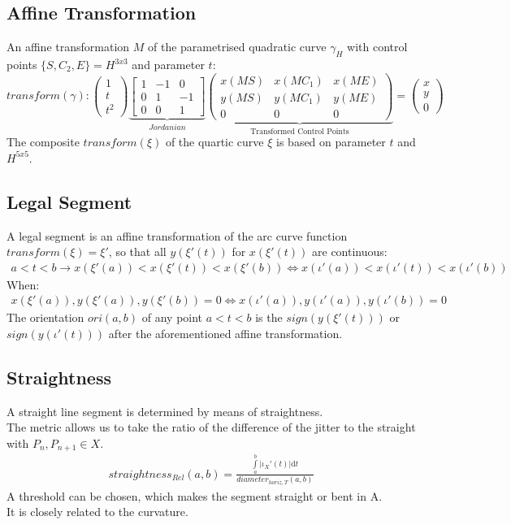 \documentclass{report}
\begin{document}
\subsection{Affine Transformation}
An affine transformation $M$ of the parametrised quadratic curve $\gamma_{H}$ with control points $\{S,C_{2},E\} = H^{3x3}$ and parameter $t$:
\begin{equation}
transform(\gamma):
\begin{pmatrix}
1 \\
t \\
t^2
\end{pmatrix}
\underbrace{\begin{bmatrix}
1 & -1 & 0\\
0 & 1 & -1\\
0 & 0 &1
\end{bmatrix}}_{Jordanian}
\underbrace{\begin{pmatrix}
x(MS) & x(MC_{1}) & x(ME) \\
y(MS) & y(MC_{1}) & y(ME) \\
0 & 0 & 0
\end{pmatrix}}_{\text{Transformed Control Points}}
=
\begin{pmatrix}
x \\
y \\
0
\end{pmatrix}
\end{equation}
The composite $transform(\xi)$ of the quartic curve $\xi$ is based on parameter $t$ and $H^{5x5}$. ~\cite[Spline\_Axioms.tex]{Analyzer}

\subsection{Legal Segment}
A legal segment is an affine transformation of the arc curve function $transform(\xi) = \xi'$, so that all $y(\xi'(t))$ for $x(\xi'(t))$ are continuous:
\begin{align}
a<t<b\rightarrow x(\xi'(a))<x(\xi'(t))<x(\xi'(b)) \Leftrightarrow x(\iota'(a))<x(\iota'(t))<x(\iota'(b))
\end{align}
When:
\begin{align}
x(\xi'(a)),y(\xi'(a)), y(\xi'(b)) = 0 \Leftrightarrow x(\iota'(a)),y(\iota'(a)), y(\iota'(b)) = 0
\end{align}
The orientation $ori(a,b)$ of any point $a < t < b$ is the $sign(y(\xi'(t)))$ or $sign(y(\iota'(t)))$ after the aforementioned affine transformation.

\subsection{Straightness}
A straight line segment is determined by means of straightness.\\
The metric allows us to take the ratio of the difference of the jitter to the straight with $P_{n},P_{n+1} \in X$. \\
\begin{align}
straightness_{Rel}(a,b)=\frac{\int \limits _{a}^{b} \lvert \iota_{X}'(t) \rvert \mathrm{d}t}{diameter_{horiz,T}(a,b)}
\end{align}
A threshold can be chosen, which makes the segment straight or bent in A.\\
It is closely related to the curvature.
\end{document}
